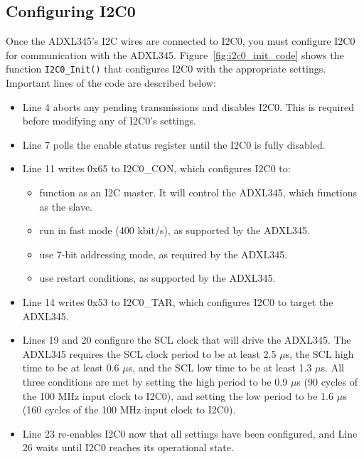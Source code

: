 \documentclass[11pt, twoside, pdftex]{article}
\begin{document}
\subsection{Configuring I2C0}
\label{sec:configure_i2c0}

Once the ADXL345's I2C wires are connected to I2C0, you must configure I2C0 for communication with the ADXL345. Figure~\ref{fig:i2c0_init_code} shows the function \texttt{I2C0\_Init()} that configures I2C0 with the appropriate settings. Important lines of the code are described below:
\begin{itemize} \itemsep0.5pt
\item Line 4 aborts any pending transmissions and disables I2C0. This is required before modifying any of I2C0's settings.
\item Line 7 polls the enable status register until the I2C0 is fully disabled. 
\item Line 11 writes 0x65 to I2C0\_CON, which configures I2C0 to:
	\begin{itemize} \itemsep0.5pt
	\item function as an I2C master. It will control the ADXL345, which functions as the slave.
	\item run in fast mode (400 kbit/s), as supported by the ADXL345.
	\item use 7-bit addressing mode, as required by the ADXL345.
	\item use restart conditions, as supported by the ADXL345. 
	\end{itemize}
\item Line 14 writes 0x53 to I2C0\_TAR, which configures I2C0 to target the ADXL345.
\item Lines 19 and 20 configure the SCL clock that will drive the ADXL345. The ADXL345 requires the SCL clock period to be at least 2.5 $\mu$s, the SCL high time to be at least 0.6 $\mu$s, and the SCL low time to be at least 1.3 $\mu$s. All three conditions are met by setting the high period to be 0.9 $\mu$s (90 cycles of the 100 MHz input clock to I2C0), and setting the low period to be 1.6 $\mu$s (160 cycles of the 100 MHz input clock to I2C0).
\item Line 23 re-enables I2C0 now that all settings have been configured, and Line 26 waits until I2C0 reaches its operational state.
\end{itemize}
\end{document}
